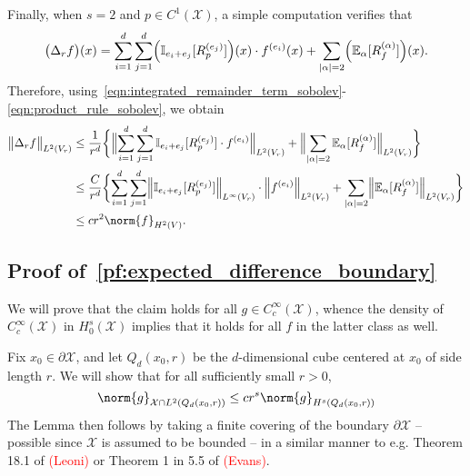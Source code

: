 \documentclass{article}
\newcommand{\abs}[1]{\left \lvert #1 \right \rvert}
\newcommand{\1}{\mathbf{1}}
\newcommand{\Xset}{\mathcal{X}}
\newcommand{\Leb}{L}
\newcommand{\Ebb}{\mathbb{E}}
\newcommand{\Ibb}{\mathbb{I}}
\theoremstyle{alden}
\theoremstyle{aldenthm}
\theoremstyle{definition}
\theoremstyle{remark}
\begin{document}
Finally, when $s = 2$ and $p \in C^1(\Xset)$, a simple computation verifies that
\begin{equation*}
\bigl(\Delta_rf\bigr)(x) = \sum_{i = 1}^{d} \sum_{j = 1}^{d} \Bigl(\Ibb_{e_i + e_j}[R_p^{(e_j)}]\Bigr)(x) \cdot f^{(e_i)}(x) + \sum_{\abs{\alpha} = 2}  \Bigl(\Ebb_{\alpha}[R_f^{(\alpha)}]\Bigr)(x).
\end{equation*}
Therefore, using~\eqref{eqn:integrated_remainder_term_sobolev}-\eqref{eqn:product_rule_sobolev}, we obtain
\begin{align*}
\bigl\|\Delta_rf\bigr\|_{\Leb^2(V_r)} & \leq \frac{1}{r^d} \biggl\{ \Bigl\|\sum_{i = 1}^{d} \sum_{j = 1}^{d} \Ibb_{e_i + e_j}[R_p^{(e_j)}] \cdot f^{(e_i)} \Bigr\|_{\Leb^2(V_r)} + \Bigl\|\sum_{\abs{\alpha} = 2} \Ebb_{\alpha}[R_f^{(\alpha)}]\Bigr\|_{\Leb^2(V_r)} \biggr\} \\
& \leq \frac{C}{r^d} \biggl\{ \sum_{i = 1}^{d} \sum_{j = 1}^{d} \Bigl\|\Ibb_{e_i + e_j}[R_p^{(e_j)}]\Bigr\|_{\Leb^{\infty}(V_r)} \cdot \Bigl\|f^{(e_i)} \Bigr\|_{\Leb^2(V_r)} + \sum_{\abs{\alpha} = 2} \Bigl\|\Ebb_{\alpha}[R_f^{(\alpha)}]\Bigr\|_{\Leb^2(V_r)} \biggr\} \\
& \leq c r^2 \norm{f}_{H^2(V)}.
\end{align*}

\subsection{Proof of~\eqref{pf:expected_difference_boundary}}
\label{subsec:proof_sobolev_norm_boundary}
We will prove that the claim holds for all $g \in C_c^{\infty}(\Xset)$, whence the density of $C_c^{\infty}(\Xset)$ in $H_0^s(\Xset)$ implies that it holds for all $f$ in the latter class as well.

Fix $x_0 \in \partial \Xset$, and let $Q_d(x_0,r)$ be the $d$-dimensional cube centered at $x_0$ of side length $r$. We will show that for all sufficiently small $r > 0$,
\begin{equation}
\norm{g}_{\Xset \cap \Leb^2(Q_d(x_0,r))} \leq c r^s \norm{g}_{H^s(Q_d(x_0,r))}
\end{equation}
The Lemma then follows by taking a finite covering of the boundary $\partial \Xset$ -- possible since $\Xset$ is assumed to be bounded -- in a similar manner to e.g. Theorem 18.1 of \textcolor{red}{(Leoni)} or Theorem 1 in 5.5 of \textcolor{red}{(Evans)}.
\end{document}
